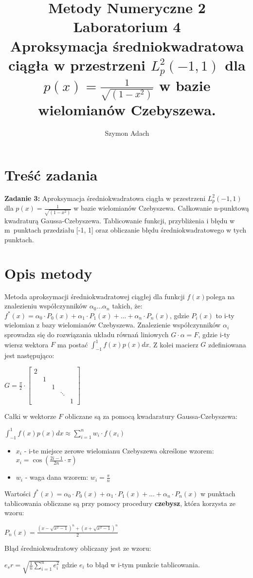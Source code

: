 \documentclass[]{article}
\title{\textbf{ Metody Numeryczne 2\\Laboratorium 4}\\
Aproksymacja średniokwadratowa ciągła w przestrzeni $L_p^2(-1,1)$ dla $p(x)=\frac{1}{\sqrt{(1-x^2)}}$ w bazie wielomianów Czebyszewa. }
\author{Szymon Adach}
\let\normalint\int %
\def\int{\displaystyle\normalint} %
\begin{document}
\maketitle


\section{Treść zadania}
 \textbf{Zadanie 3:} Aproksymacja średniokwadratowa ciągła w przestrzeni $L_p^2(-1,1)$ dla $p(x)=\frac{1}{\sqrt{(1-x^2)}}$ w bazie wielomianów Czebyszewa. Całkowanie n-punktową kwadraturą Gaussa-Czebyszewa. Tablicowanie funkcji, przybliżenia i błędu w m~punktach przedziału [-1, 1] oraz obliczanie błędu średniokwadratowego w tych punktach.
\section{Opis metody}
Metoda aproksymacji średniokwadratowej ciągłej dla funkcji $f(x)$polega na znalezieniu współczynników $\alpha_0...\alpha_n$ takich, że:\\ $f^*(x)=\alpha_0 \cdot P_0(x)+\alpha_1 \cdot P_1(x)+...+\alpha_n\cdot P_n(x)$, gdzie $P_i(x)$ to i-ty wielomian z bazy wielomianów Czebyszewa. Znalezienie współczynników $\alpha_i$ sprowadza się do rozwiązania układu równań liniowych $G\cdot\alpha=F$, gdzie i-ty wiersz wektora $F$ ma postać $\int_{-1}^{1}f(x)p(x)dx$. Z kolei macierz $G$ zdefiniowana jest następująco: 
\begin{center} $G = \frac{\pi}{2} \cdot
\begin{bmatrix}
2 &  &  & \\
& 1 &  &\\
& & 1 & \\
& & & \ddots \\
& & & & 1
\end{bmatrix}$ 
\end{center} 
\newpage
Całki w wektorze $F$ obliczane są za pomocą kwadaratury Gaussa-Czebyszewa:
\begin{center}
$\int_{-1}^{1}f(x)p(x)dx \approx \sum_{i=1}^{n}w_i\cdot f(x_i)$ \\
\end{center}
\begin{itemize}
\item $x_i$ - i-te miejsce zerowe wielomianu Czebyszewa określone wzorem:\\
$x_i=\cos(\frac{2i-1}{2n}\cdot \pi)$
\item$w_i$ - waga dana wzorem:
$w_i=\frac{\pi}{n}$\\
\end{itemize}
Wartości $f^*(x)=\alpha_0 \cdot P_0(x)+\alpha_1 \cdot P_1(x)+...+\alpha_n\cdot P_n(x)$ w punktach tablicowania obliczane są przy pomocy procedury \textbf{czebysz}, która korzysta ze wzoru:
\begin{center}
$P_n(x)=\frac{(x-\sqrt{x^2-1})^n+(x+\sqrt{x^2-1})^n}{2}$
\end{center}
Błąd średniokwadratowy obliczany jest ze wzoru:\\
\begin{center}
$e_sr=\sqrt{\frac{1}{n}\sum_{i=1}^{n}e_i^2}$ gdzie $e_i$ to błąd w i-tym punkcie tablicowania.
\end{center} 
\end{document}
